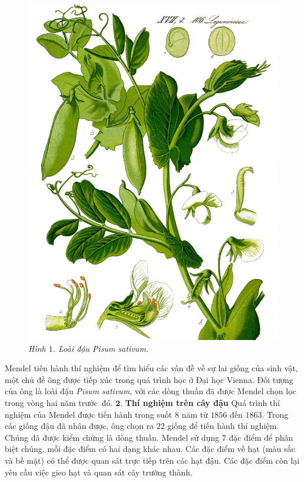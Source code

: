 \begin{multicols}{2}
\begin{figure}[H]
		\includegraphics[width=1\linewidth]{image002}
		\caption{\small\textit{\color{timhieukhoahoc}Hình $1$. Loài đậu Pisum sativum.}}
		\vspace*{-10pt}
	\end{figure}
	Mendel tiến hành thí nghiệm để tìm hiểu các vấn đề về sự lai giống của sinh vật, một chủ đề ông được tiếp xúc trong quá trình học ở Đại học Vienna. Đối tượng của ông là loài đậu \textit{Pisum sativum}, với các dòng thuần đã được Mendel chọn lọc trong vòng hai năm trước~đó.
	\vskip 0.1cm
	$\pmb{2.}$ \textbf{\color{timhieukhoahoc}Thí nghiệm trên cây đậu}
	\vskip 0.1cm
	Quá trình thí nghiệm của Mendel được tiến hành trong suốt $8$ năm từ $1856$ đến $1863$. Trong các giống đậu đã nhân được, ông chọn ra $22$ giống để tiến hành thí nghiệm. Chúng đã được kiểm chứng là dòng thuần. Mendel sử dụng $7$ đặc điểm để phân biệt chúng, mỗi đặc điểm có hai dạng khác nhau. Các đặc điểm về hạt (màu sắc và bề mặt) có thể được quan sát trực tiếp trên các hạt đậu. Các đặc điểm còn lại yêu cầu việc gieo hạt và quan sát cây trưởng thành.

\end{multicols}
